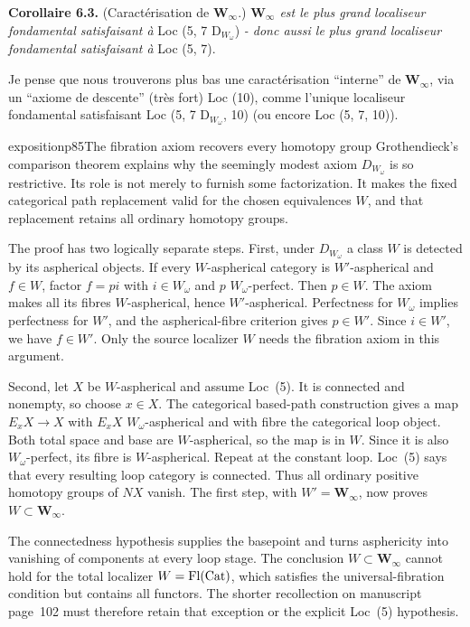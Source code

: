 \textbf{Corollaire 6.3.} (Caractérisation de $\mathbf{W}_\infty$.) \textit{$\mathbf{W}_\infty$ est le plus grand localiseur fondamental satisfaisant à} Loc (5, 7 D$_{W_\omega}$) \textit{- donc aussi le plus grand localiseur fondamental satisfaisant à} Loc (5, 7).

Je pense que nous trouverons plus bas une caractérisation “interne” de $\mathbf{W}_\infty$, via un “axiome de descente” (très fort) Loc (10),
comme l'unique localiseur fondamental satisfaisant Loc (5, 7 D$_{W_\omega}$, 10) (ou encore Loc (5, 7, 10)).

\begin{dcomment}{exposition}{p85}{The fibration axiom recovers every homotopy group}
Grothendieck's comparison theorem explains why the seemingly modest axiom $D_{W_\omega}$ is so restrictive. Its role is not merely to furnish some factorization. It makes the fixed categorical path replacement valid for the chosen equivalences $W$, and that replacement retains all ordinary homotopy groups.

The proof has two logically separate steps. First, under $D_{W_\omega}$ a class $W$ is detected by its aspherical objects. If every $W$-aspherical category is $W'$-aspherical and $f\in W$, factor $f=pi$ with $i\in W_\omega$ and $p$ $W_\omega$-perfect. Then $p\in W$. The axiom makes all its fibres $W$-aspherical, hence $W'$-aspherical. Perfectness for $W_\omega$ implies perfectness for $W'$, and the aspherical-fibre criterion gives $p\in W'$. Since $i\in W'$, we have $f\in W'$. Only the source localizer $W$ needs the fibration axiom in this argument.

Second, let $X$ be $W$-aspherical and assume Loc~(5). It is connected and nonempty, so choose $x\in X$. The categorical based-path construction gives a map $E_xX\to X$ with $E_xX$ $W_\omega$-aspherical and with fibre the categorical loop object. Both total space and base are $W$-aspherical, so the map is in $W$. Since it is also $W_\omega$-perfect, its fibre is $W$-aspherical. Repeat at the constant loop. Loc~(5) says that every resulting loop category is connected. Thus all ordinary positive homotopy groups of $NX$ vanish. The first step, with $W'=\mathbf W_\infty$, now proves $W\subset\mathbf W_\infty$.

The connectedness hypothesis supplies the basepoint and turns asphericity into vanishing of components at every loop stage. The conclusion $W\subset\mathbf W_\infty$ cannot hold for the total localizer $W=\operatorname{Fl}(\mathrm{Cat})$, which satisfies the universal-fibration condition but contains all functors. The shorter recollection on manuscript page~102 must therefore retain that exception or the explicit Loc~(5) hypothesis.


\end{dcomment}

